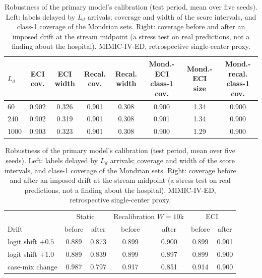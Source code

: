 \begin{table}[t]
\centering
\caption{Robustness of the primary model's calibration (test period, mean over five seeds). Left: labels delayed by $L_d$ arrivals; coverage and width of the score intervals, and class-1 coverage of the Mondrian sets. Right: coverage before and after an imposed drift at the stream midpoint (a stress test on real predictions, not a finding about the hospital). MIMIC-IV-ED, retrospective single-center proxy.}
\label{tab:lag-drift}
\begin{tabular}{lccccccc}
\toprule
$L_d$ & ECI cov. & ECI width & Recal. cov. & Recal. width & Mond.-ECI class-1 cov. & Mond.-ECI size & Mond.-recal. class-1 cov. \\
\midrule
60 & 0.902 & 0.326 & 0.901 & 0.308 & 0.900 & 1.34 & 0.900 \\
240 & 0.902 & 0.319 & 0.901 & 0.308 & 0.901 & 1.34 & 0.900 \\
1000 & 0.903 & 0.323 & 0.901 & 0.308 & 0.900 & 1.29 & 0.900 \\
\bottomrule
\end{tabular}

\medskip
\begin{tabular}{lcccccc}
\toprule
 & \multicolumn{2}{c}{Static} & \multicolumn{2}{c}{Recalibration $W=10$k} & \multicolumn{2}{c}{ECI} \\
Drift & before & after & before & after & before & after \\
\midrule
logit shift $+0.5$ & 0.889 & 0.873 & 0.899 & 0.900 & 0.899 & 0.901 \\
logit shift $+1.0$ & 0.889 & 0.839 & 0.899 & 0.897 & 0.899 & 0.900 \\
case-mix change & 0.987 & 0.797 & 0.917 & 0.851 & 0.914 & 0.900 \\
\bottomrule
\end{tabular}
\end{table}
